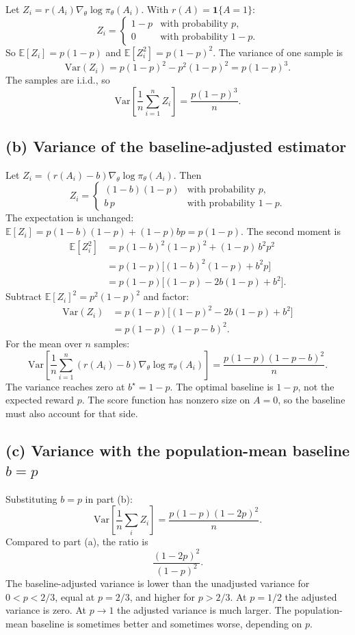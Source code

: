 \documentclass[11pt]{article}
\newcommand{\E}{\mathbb{E}}
\newcommand{\Var}{\mathrm{Var}}
\newcommand{\policy}{\pi_\theta}
\begin{document}
Let $Z_i = r(A_i)\nabla_\theta \log \policy(A_i)$. With $r(A)=\mathbf{1}\{A=1\}$:
\[
Z_i =
\begin{cases}
1-p & \text{with probability } p, \\
0 & \text{with probability } 1-p.
\end{cases}
\]
So $\E[Z_i] = p(1-p)$ and $\E[Z_i^2] = p(1-p)^2$. The variance of one sample is
\[
\Var(Z_i) = p(1-p)^2 - p^2(1-p)^2 = p(1-p)^3.
\]
The samples are i.i.d., so
\[
\Var\!\left[\frac{1}{n}\sum_{i=1}^n Z_i\right] = \frac{p(1-p)^3}{n}.
\]

\subsection*{(b) Variance of the baseline-adjusted estimator}

Let $Z_i = (r(A_i)-b)\nabla_\theta \log \policy(A_i)$. Then
\[
Z_i =
\begin{cases}
(1-b)(1-p) & \text{with probability } p, \\
b\,p & \text{with probability } 1-p.
\end{cases}
\]
The expectation is unchanged: $\E[Z_i] = p(1-b)(1-p) + (1-p)bp = p(1-p)$. The second moment is
\begin{align*}
\E[Z_i^2] &= p(1-b)^2(1-p)^2 + (1-p)\,b^2 p^2 \\
&= p(1-p)\bigl[(1-b)^2(1-p) + b^2 p\bigr] \\
&= p(1-p)\bigl[(1-p) - 2b(1-p) + b^2\bigr].
\end{align*}
Subtract $\E[Z_i]^2 = p^2(1-p)^2$ and factor:
\begin{align*}
\Var(Z_i) &= p(1-p)\bigl[(1-p)^2 - 2b(1-p) + b^2\bigr] \\
&= p(1-p)\,(1-p-b)^2.
\end{align*}
For the mean over $n$ samples:
\[
\boxed{\;\Var\!\left[\frac{1}{n}\sum_{i=1}^n (r(A_i)-b)\nabla_\theta \log \policy(A_i)\right]
= \frac{p(1-p)(1-p-b)^2}{n}.\;}
\]
The variance reaches zero at $b^\star = 1-p$. The optimal baseline is $1-p$,
not the expected reward $p$. The score function has nonzero size on $A=0$,
so the baseline must also account for that side.

\subsection*{(c) Variance with the population-mean baseline $b=p$}
Substituting $b=p$ in part (b):
\[
\Var\!\left[\frac{1}{n}\sum_i Z_i\right] = \frac{p(1-p)(1-2p)^2}{n}.
\]
Compared to part (a), the ratio is
\[
\frac{(1-2p)^2}{(1-p)^2}.
\]
The baseline-adjusted variance is lower than the unadjusted variance for
$0<p<2/3$, equal at $p=2/3$, and higher for $p>2/3$. At $p=1/2$ the adjusted
variance is zero. At $p \to 1$ the adjusted variance is much larger. The
population-mean baseline is sometimes better and sometimes worse, depending on $p$.
\end{document}

